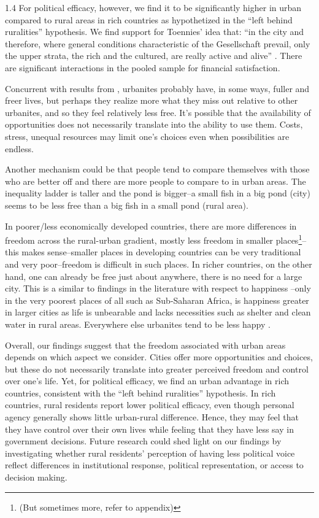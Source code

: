 \documentclass[10pt, letterpaper]{article}
\begin{document}
\begin{spacing}{1.4}
For political efficacy, however, we find it to be significantly higher in urban compared to rural areas in rich countries as hypothetized in the ``left behind ruralities'' hypothesis.
We find support for Toennies' idea that: ``in the city and therefore, where general conditions characteristic of the Gesellschaft prevail, only the upper strata, the rich and the cultured, are really active and alive'' \citep[p. 227]{tonnies57}.
There are significant interactions in the pooled sample for financial satisfaction. 

  
Concurrent with results from \citet{aok24swls}, urbanites probably have, in some ways, fuller and freer lives, but perhaps
they realize more what they miss out relative to other urbanites, and so they feel relatively less free. It's possible that the availability of opportunities does not necessarily translate into the ability to use them. Costs, stress, unequal resources may limit one's choices even when possibilities are endless.   

Another mechanism could be that people tend to compare themselves with those who are better off\citep{frey02s} and there are more people to compare to in urban areas. The inequality ladder is taller and the pond is bigger--a small fish in a big pond (city) seems to be less free than a big fish in a small pond (rural area). 

In poorer/less economically developed countries, there are more differences in freedom across the rural-urban gradient, mostly less freedom in smaller places\footnote{(But sometimes more, refer to appendix)}--this makes sense--smaller places in developing countries can be very traditional and very poor--freedom is difficult in such places. In richer countries, on the other hand, one can already be free just about anywhere, there is no need for a large city. This is a similar to findings in the literature with respect to happiness \citep{aokCityBook15}--only in the very poorest places of all such as Sub-Saharan Africa, is happiness greater in larger cities as life is unbearable and lacks necessities such as shelter and clean water in rural areas. Everywhere else urbanites tend to be less happy \citep{aok21}.

Overall, our findings suggest that the freedom associated with urban areas depends on which aspect we consider. Cities offer more opportunities and choices, but these do not necessarily translate into greater perceived freedom and control over one's life. Yet, for political efficacy, we find an urban advantage in rich countries, consistent with the ``left behind ruralities'' hypothesis. In rich countries, rural residents report lower political efficacy, even though personal agency generally shows little urban-rural difference. Hence, they may feel that they have control over their own lives while feeling that they have less say in government decisions. Future research could shed light on our findings by investigating whether rural residents' perception of having less political voice reflect differences in institutional response, political representation, or access to decision making.



\end{spacing}
\end{document}
